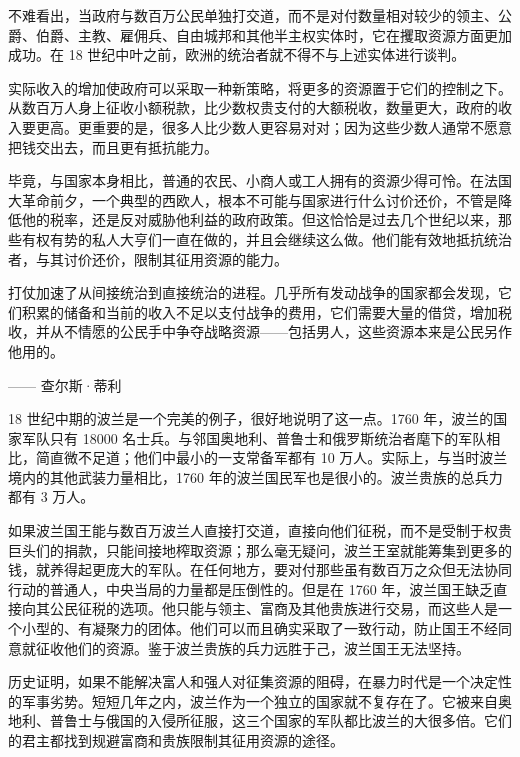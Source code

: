 不难看出，当政府与数百万公民单独打交道，而不是对付数量相对较少的领主、公爵、伯爵、主教、雇佣兵、自由城邦和其他半主权实体时，它在攫取资源方面更加成功。在 18 世纪中叶之前，欧洲的统治者就不得不与上述实体进行谈判。

实际收入的增加使政府可以采取一种新策略，将更多的资源置于它们的控制之下。从数百万人身上征收小额税款，比少数权贵支付的大额税收，数量更大，政府的收入要更高。更重要的是，很多人比少数人更容易对对；因为这些少数人通常不愿意把钱交出去，而且更有抵抗能力。

毕竟，与国家本身相比，普通的农民、小商人或工人拥有的资源少得可怜。在法国大革命前夕，一个典型的西欧人，根本不可能与国家进行什么讨价还价，不管是降低他的税率，还是反对威胁他利益的政府政策。但这恰恰是过去几个世纪以来，那些有权有势的私人大亨们一直在做的，并且会继续这么做。他们能有效地抵抗统治者，与其讨价还价，限制其征用资源的能力。

\begin{tcolorbox}
\kaishu 打仗加速了从间接统治到直接统治的进程。几乎所有发动战争的国家都会发现，它们积累的储备和当前的收入不足以支付战争的费用，它们需要大量的借贷，增加税收，并从不情愿的公民手中争夺战略资源——包括男人，这些资源本来是公民另作他用的。
\begin{flushright}
—— 查尔斯·蒂利 
\end{flushright}
\end{tcolorbox}

18 世纪中期的波兰是一个完美的例子，很好地说明了这一点。1760 年，波兰的国家军队只有 18000 名士兵。与邻国奥地利、普鲁士和俄罗斯统治者麾下的军队相比，简直微不足道；他们中最小的一支常备军都有 10 万人。实际上，与当时波兰境内的其他武装力量相比，1760 年的波兰国民军也是很小的。波兰贵族的总兵力都有 3 万人。

如果波兰国王能与数百万波兰人直接打交道，直接向他们征税，而不是受制于权贵巨头们的捐款，只能间接地榨取资源；那么毫无疑问，波兰王室就能筹集到更多的钱，就养得起更庞大的军队。在任何地方，要对付那些虽有数百万之众但无法协同行动的普通人，中央当局的力量都是压倒性的。但是在 1760 年，波兰国王缺乏直接向其公民征税的选项。他只能与领主、富商及其他贵族进行交易，而这些人是一个小型的、有凝聚力的团体。他们可以而且确实采取了一致行动，防止国王不经同意就征收他们的资源。鉴于波兰贵族的兵力远胜于己，波兰国王无法坚持。

历史证明，如果不能解决富人和强人对征集资源的阻碍，在暴力时代是一个决定性的军事劣势。短短几年之内，波兰作为一个独立的国家就不复存在了。它被来自奥地利、普鲁士与俄国的入侵所征服，这三个国家的军队都比波兰的大很多倍。它们的君主都找到规避富商和贵族限制其征用资源的途径。

